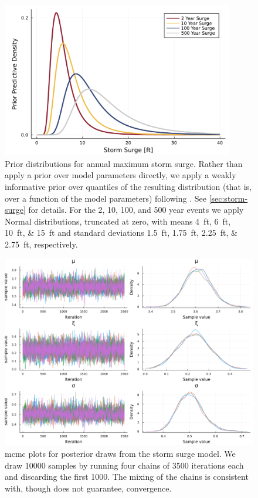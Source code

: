 \documentclass[12pt]{article}
\begin{document}
\begin{figure}
    \centering
    \includegraphics[width=4in]{surge-gev-priors}
    \caption{
        Prior distributions for annual maximum storm surge.
        Rather than apply a prior over model parameters directly, we apply a weakly informative prior over quantiles of the resulting distribution (that is, over a function of the model parameters) following \citet{coles_evd:1996}.
        See \cref{sec:storm-surge} for details.
        For the 2, 10, 100, and 500 year events we apply Normal distributions, truncated at zero, with means \SIlist{4;6;10;15}{ft} and standard deviations \SIlist{1.5;1.75;2.25;2.75}{ft}, respectively.
    }\label{fig:surge-gev-priors}
\end{figure}

\begin{figure}
    \centering
    \includegraphics[width=\textwidth]{surge-posterior-chains}
    \caption{
        \Gls{mcmc} plots for posterior draws from the storm surge model.
        We draw \num{10000} samples by running four chains of \num{3500} iterations each and discarding the first \num{1000}.
        The mixing of the chains is consistent with, though does not guarantee, convergence.
    }\label{fig:surge-posterior-chains}
\end{figure}
\end{document}
